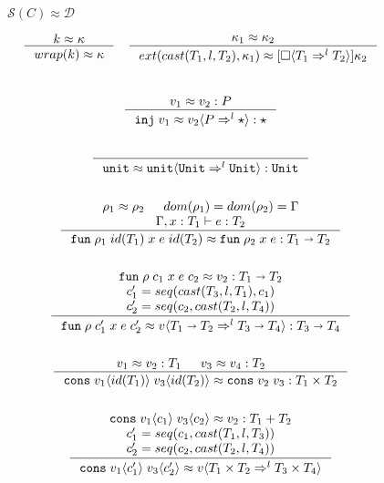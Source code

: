 \documentclass[acmsmall,review,anonymous]{acmart}\settopmatter{printfolios=true,printccs=false,printacmref=false}
\newcommand{\plus}[0]{+}
\newcommand{\judgeType}[2]{#1 : #2}
\newcommand{\TOOdyn}[0]{\star}
\newcommand{\POOunit}[0]{\mathtt{Unit}}
\newcommand{\POOfun}[2]{#1 \shortrightarrow #2}
\newcommand{\POOprod}[2]{#1 \times #2}
\newcommand{\POOsum}[2]{#1 \plus #2}
\newcommand{\cOOcast}[3]{#1 \Rightarrow^{#2} #3}
\newcommand{\vOOcast}[2]{#1\langle#2\rangle}
\newcommand{\vOOfun}[3]{\mathtt{fun} \; #1 \; #2 \; #3}
\newcommand{\vOOtt}[0]{\mathtt{unit}}
\newcommand{\vOOcons}[2]{\mathtt{cons}\;#1\;#2}
\newcommand{\kOOcast}[2]{
	[\square \langle #1 \rangle]#2}
\newcommand{\hcvOOinj}[2]{\mathtt{inj} \; #2}
\newcommand{\hcvOOfun}[5]{\mathtt{fun} \; #2 \; #1 \; #3 \; #4 \; #5}
\newcommand{\hcvOOtt}[0]{\mathtt{unit}}
\newcommand{\hcvOOcons}[4]{\mathtt{cons}\;#1\langle#2\rangle\;#3\langle#4\rangle}
\newcommand{\ineffCEKD}{$\mathcal{D}$}
\newcommand{\effCEK}[1]{$\mathcal{S}(#1)$}
\begin{document}
\begin{figure}
	$\text{\effCEK{C}} \approx \text{\ineffCEKD}$
	
	\fbox{$\kappa \approx \kappa$}
	\begin{gather*}
	\inference{
		k \approx \kappa
	}{
		wrap(k) \approx \kappa
	}
	\quad
	\inference{
		\kappa_1 \approx \kappa_2
	}{
		ext(cast(T_1,l,T_2),\kappa_1) \approx 
		\kOOcast{\cOOcast{T_1}{l}{T_2}}{\kappa_2}
	}
\\
	\end{gather*}
\\	
	\begin{gather*}
	\inference{
		v_1 \approx v_2 : P
	}{
		\hcvOOinj{P}{v_1} \approx \vOOcast{v_2}{\cOOcast{P}{l}{\TOOdyn}}
		: \TOOdyn
	}
\\ \\
	\inference{}{
		\hcvOOtt \approx \vOOcast{\vOOtt}{\cOOcast{\POOunit}{l}{\POOunit}}
		: \POOunit
	}
	\\ \\
	\inference{
		\rho_1 \approx \rho_2 &
		dom(\rho_1) = dom(\rho_2) = \Gamma \\
		\Gamma , x : T_1 \vdash e : T_2
	}{
		\hcvOOfun{id(T_1)}{\rho_1}{x}{e}{id(T_2)}
		\approx
		\vOOfun{\rho_2}{x}{e}
		: \POOfun{T_1}{T_2}
	}
\\ \\
\inference{
\hcvOOfun{c_1}{\rho}{x}{e}{c_2} \approx v_2 : \POOfun{T_1}{T_2} \\
c_1' = seq(cast(T_3,l,T_1),c_1) \\
c_2' = seq(c_2,cast(T_2,l,T_4))
}{
\hcvOOfun{c_1'}{\rho}{x}{e}{c_2'}
\approx
\vOOcast{v}{\cOOcast{\POOfun{T_1}{T_2}}{l}{\POOfun{T_3}{T_4}}}
: \POOfun{T_3}{T_4}
}
\\ \\
	\inference{
		v_1 \approx v_2 : T_1 &
		v_3 \approx v_4 : T_2 &
	}{
		\hcvOOcons{v_1}{id(T_1)}{v_3}{id(T_2)}
		\approx
		\vOOcons{v_2}{v_3}
		: \POOprod{T_1}{T_2}
	}
\\ \\
	\inference{
		\hcvOOcons{v_1}{c_1}{v_3}{c_2} \approx v_2 : \POOsum{T_1}{T_2} \\
		c_1' = seq(c_1,cast(T_1,l,T_3)) \\
		c_2' = seq(c_2,cast(T_2,l,T_4))
	}{
		\hcvOOcons{v_1}{c_1'}{v_3}{c_2'} \approx
		\vOOcast{v}{\cOOcast{\POOprod{T_1}{T_2}}{l}{\POOprod{T_3}{T_4}}}
}
\end{gather*}
\end{figure}
\end{document}

